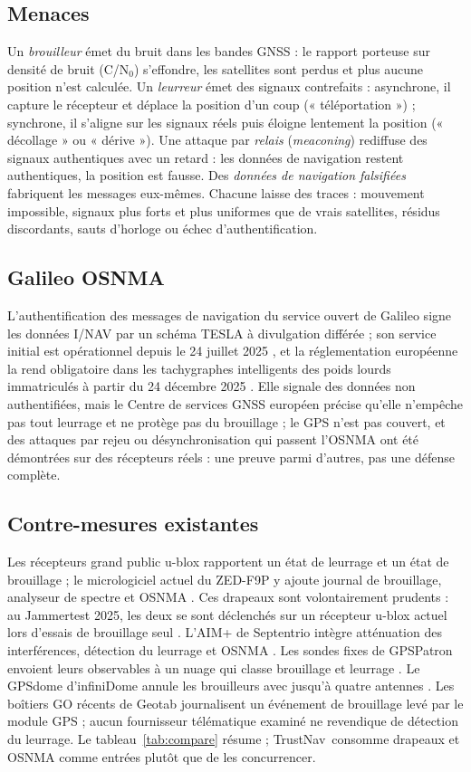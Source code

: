 \documentclass[conference]{IEEEtran}
\newcommand{\sys}{TrustNav}
\begin{document}
\subsection{Menaces}
Un \emph{brouilleur} émet du bruit dans les bandes GNSS : le rapport porteuse sur densité de bruit (C/N$_0$) s'effondre, les satellites sont perdus et plus aucune position n'est calculée. Un \emph{leurreur} émet des signaux contrefaits : asynchrone, il capture le récepteur et déplace la position d'un coup (« téléportation ») ; synchrone, il s'aligne sur les signaux réels puis éloigne lentement la position (« décollage » ou « dérive »). Une attaque par \emph{relais} (\emph{meaconing}) rediffuse des signaux authentiques avec un retard : les données de navigation restent authentiques, la position est fausse. Des \emph{données de navigation falsifiées} fabriquent les messages eux-mêmes. Chacune laisse des traces : mouvement impossible, signaux plus forts et plus uniformes que de vrais satellites, résidus discordants, sauts d'horloge ou échec d'authentification.

\subsection{Galileo OSNMA}
L'authentification des messages de navigation du service ouvert de Galileo signe les données I/NAV par un schéma TESLA à divulgation différée ; son service initial est opérationnel depuis le 24 juillet 2025 \cite{euspa2025}, et la réglementation européenne la rend obligatoire dans les tachygraphes intelligents des poids lourds immatriculés à partir du 24 décembre 2025 \cite{eu2023980}. Elle signale des données non authentifiées, mais le Centre de services GNSS européen précise qu'elle n'empêche pas tout leurrage et ne protège pas du brouillage \cite{gsc_faq} ; le GPS n'est pas couvert, et des attaques par rejeu ou désynchronisation qui passent l'OSNMA ont été démontrées sur des récepteurs réels \cite{wang2025} : une preuve parmi d'autres, pas une défense complète.

\subsection{Contre-mesures existantes}
Les récepteurs grand public u-blox rapportent un état de leurrage et un état de brouillage ; le micrologiciel actuel du ZED-F9P y ajoute journal de brouillage, analyseur de spectre et OSNMA \cite{ublox2024}. Ces drapeaux sont volontairement prudents : au Jammertest 2025, les deux se sont déclenchés sur un récepteur u-blox actuel lors d'essais de brouillage seul \cite{ublox_jammertest}. L'AIM+ de Septentrio intègre atténuation des interférences, détection du leurrage et OSNMA \cite{septentrio2025}. Les sondes fixes de GPSPatron envoient leurs observables à un nuage qui classe brouillage et leurrage \cite{gpspatron}. Le GPSdome d'infiniDome annule les brouilleurs avec jusqu'à quatre antennes \cite{gpsdome2}. Les boîtiers GO récents de Geotab journalisent un événement de brouillage levé par le module GPS \cite{geotab2025} ; aucun fournisseur télématique examiné ne revendique de détection du leurrage. Le tableau~\ref{tab:compare} résume ; \sys\ consomme drapeaux et OSNMA comme entrées plutôt que de les concurrencer.
\end{document}
